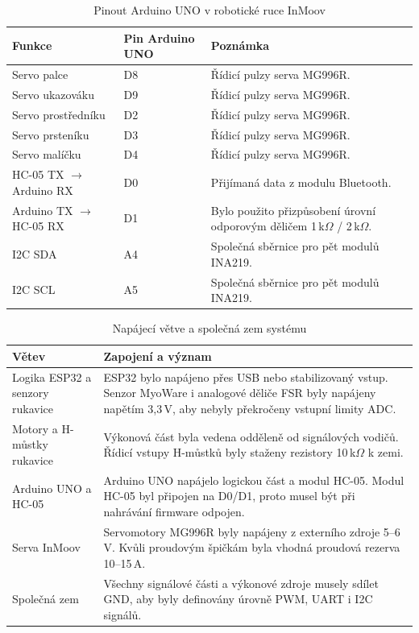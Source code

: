 \begin{table}[H]
\centering
\caption{Pinout Arduino UNO v robotické ruce InMoov}
\label{tab:pinout-arduino}
\begin{tabular}{|p{}|p{}|p{}|}
\hline
\textbf{Funkce} & \textbf{Pin Arduino UNO} & \textbf{Poznámka} \\
\hline
Servo palce & D8 & Řídicí pulzy serva MG996R. \\
\hline
Servo ukazováku & D9 & Řídicí pulzy serva MG996R. \\
\hline
Servo prostředníku & D2 & Řídicí pulzy serva MG996R. \\
\hline
Servo prsteníku & D3 & Řídicí pulzy serva MG996R. \\
\hline
Servo malíčku & D4 & Řídicí pulzy serva MG996R. \\
\hline
HC-05 TX $\rightarrow$ Arduino RX & D0 & Přijímaná data z modulu Bluetooth. \\
\hline
Arduino TX $\rightarrow$ HC-05 RX & D1 & Bylo použito přizpůsobení úrovní odporovým děličem 1\,k$\Omega$ / 2\,k$\Omega$. \\
\hline
I2C SDA & A4 & Společná sběrnice pro pět modulů INA219. \\
\hline
I2C SCL & A5 & Společná sběrnice pro pět modulů INA219. \\
\hline
\end{tabular}
\end{table}

\begin{table}[H]
\centering
\caption{Napájecí větve a společná zem systému}
\label{tab:napajeci-vetve}
\begin{tabular}{|p{}|p{}|}
\hline
\textbf{Větev} & \textbf{Zapojení a význam} \\
\hline
Logika ESP32 a senzory rukavice & ESP32 bylo napájeno přes USB nebo stabilizovaný vstup. Senzor MyoWare i analogové děliče FSR byly napájeny napětím 3,3\,V, aby nebyly překročeny vstupní limity ADC. \\
\hline
Motory a H-můstky rukavice & Výkonová část byla vedena odděleně od signálových vodičů. Řídicí vstupy H-můstků byly staženy rezistory 10\,k$\Omega$ k zemi. \\
\hline
Arduino UNO a HC-05 & Arduino UNO napájelo logickou část a modul HC-05. Modul HC-05 byl připojen na D0/D1, proto musel být při nahrávání firmware odpojen. \\
\hline
Serva InMoov & Servomotory MG996R byly napájeny z externího zdroje 5--6\,V. Kvůli proudovým špičkám byla vhodná proudová rezerva 10--15\,A. \\
\hline
Společná zem & Všechny signálové části a výkonové zdroje musely sdílet GND, aby byly definovány úrovně PWM, UART i I2C signálů. \\
\hline
\end{tabular}
\end{table}

